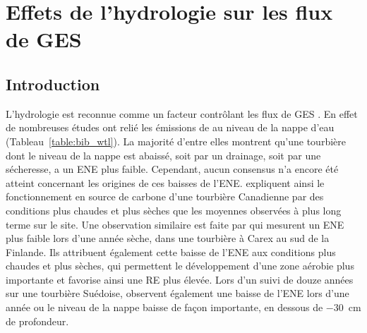 \singlespacing
\chapter{Effets de l'hydrologie sur les flux de GES}
\label{ch:4}

\minitoc

\newpage
\doublespacing
\section{Introduction}


L'hydrologie est reconnue comme un facteur contrôlant les flux de GES \citep{blodau2002}.
En effet de nombreuses études ont relié les émissions de \coo au niveau de la nappe d'eau (Tableau~\ref{table:bib_wtl}).
La majorité d'entre elles montrent qu'une tourbière dont le niveau de la nappe est abaissé, soit par un drainage, soit par une sécheresse, a un ENE plus faible.
Cependant, aucun consensus n'a encore été atteint concernant les origines de ces baisses de l'ENE.
\citet{strack2013} expliquent ainsi le fonctionnement en source de carbone d'une tourbière Canadienne par des conditions plus chaudes et plus sèches que les moyennes observées à plus long terme sur le site.
Une observation similaire est faite par \citet{aurela2007} qui mesurent un ENE plus faible lors d'une année sèche, dans une tourbière à Carex au sud de la Finlande.
Ils attribuent également cette baisse de l'ENE aux conditions plus chaudes et plus sèches, qui permettent le développement d'une zone aérobie plus importante et favorise ainsi une RE plus élevée.
Lors d'un suivi de douze années sur une tourbière Suédoise, \citet{peichl2014} observent également une baisse de l'ENE lors d'une année ou le niveau de la nappe baisse de façon importante, en dessous de \SI{-30}{\centi\metre} de profondeur.

